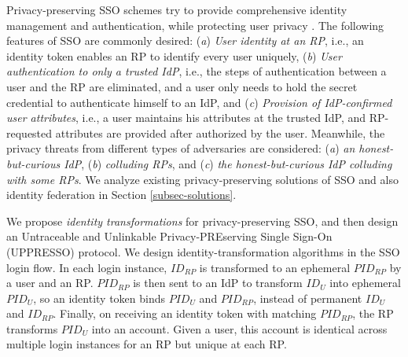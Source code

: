 Privacy-preserving SSO schemes try to provide comprehensive identity management and authentication,
    while protecting user privacy \cite{maler2008venn,NIST2017draft,BrowserID,SPRESSO}.
The following features of SSO are commonly desired:
(\emph{a}) \emph{User identity at an RP},
    i.e., an identity token enables an RP to identify every user uniquely,
(\emph{b}) \emph{User authentication to only a trusted IdP}, i.e.,
    the steps of authentication between a user and the RP are eliminated,
    and a user only needs to hold the secret credential to authenticate himself to an IdP,
and (\emph{c}) \emph{Provision of IdP-confirmed user attributes},
    i.e., a user maintains his attributes at the trusted IdP,
    and RP-requested attributes are provided %
            after authorized by the user.
Meanwhile,
    the privacy threats from different types of adversaries are considered:
    (\emph{a}) \emph{an honest-but-curious IdP},
    (\emph{b}) \emph{colluding RPs},
    and (\emph{c}) \emph{the honest-but-curious IdP colluding with some RPs}.
We analyze existing privacy-preserving solutions of SSO and also identity federation
in Section \ref{subsec-solutions}.


We propose {\em identity transformations} for privacy-preserving SSO,
and then design an Untraceable and Unlinkable Privacy-PREserving Single Sign-On (UPPRESSO) protocol.
We design identity-transformation algorithms in the SSO login flow.
In each login instance,
        $ID_{RP}$ is transformed to an ephemeral $PID_{RP}$  by a user and an RP.
$PID_{RP}$ is then sent to an IdP to transform $ID_U$ into ephemeral $PID_U$,
    so an identity token binds $PID_U$ and $PID_{RP}$, instead of permanent $ID_U$ and $ID_{RP}$.
Finally,
    on receiving an identity token with matching $PID_{RP}$,
        the RP transforms $PID_U$ into an account.
Given a user, this account is identical across multiple login instances for an RP
     but unique at each RP.

